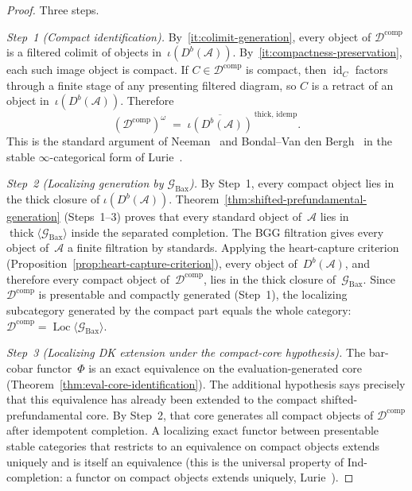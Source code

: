 \begin{proof}
Three steps.

\smallskip\noindent\textit{Step~1 \textup{(}Compact identification\textup{)}.}
By~\ref{it:colimit-generation}, every object of
$\mathcal{D}^{\mathrm{comp}}$ is a filtered colimit of objects
in~$\iota(D^b(\mathcal{A}))$.
By~\ref{it:compactness-preservation}, each such image object is
compact. If $C \in \mathcal{D}^{\mathrm{comp}}$ is compact, then
$\operatorname{id}_C$ factors through a finite stage of any
presenting filtered diagram, so $C$ is a retract of an object
in~$\iota(D^b(\mathcal{A}))$. Therefore
\[
(\mathcal{D}^{\mathrm{comp}})^{\omega}
\;=\;
\overline{\iota(D^b(\mathcal{A}))}^{\,\mathrm{thick,\, idemp}}.
\]
This is the standard argument of
Neeman~\cite[Thm.~2.1]{Neeman92}
and Bondal--Van den Bergh~\cite[Cor.~3.1.2]{BondalVdB03}
in the stable $\infty$-categorical form of
Lurie~\cite[Prop.~5.3.5.10, Prop.~5.5.7.8]{HTT}.

\smallskip\noindent\textit{Step~2 \textup{(}Localizing generation
by $\mathcal{G}_{\mathrm{Bax}}$\textup{)}.}
By Step~1, every compact object lies in the thick closure of
$\iota(D^b(\mathcal{A}))$.
Theorem~\ref{thm:shifted-prefundamental-generation}
\textup{(}Steps~1--3\textup{)} proves that every standard object
of~$\mathcal{A}$ lies in
$\operatorname{thick}\langle \mathcal{G}_{\mathrm{Bax}} \rangle$
inside the separated completion.
The BGG filtration gives every object of~$\mathcal{A}$ a finite
filtration by standards.
Applying the heart-capture criterion
\textup{(}Proposition~\ref{prop:heart-capture-criterion}\textup{)},
every object of~$D^b(\mathcal{A})$, and therefore every compact
object of~$\mathcal{D}^{\mathrm{comp}}$, lies in the thick closure
of~$\mathcal{G}_{\mathrm{Bax}}$.
Since $\mathcal{D}^{\mathrm{comp}}$ is presentable and compactly
generated \textup{(}Step~1\textup{)}, the localizing subcategory
generated by the compact part equals the whole category:
$\mathcal{D}^{\mathrm{comp}} =
\operatorname{Loc}\langle \mathcal{G}_{\mathrm{Bax}} \rangle$.

\smallskip\noindent\textit{Step~3 \textup{(}Localizing DK extension
under the compact-core hypothesis\textup{)}.}
The bar-cobar functor~$\Phi$ is an exact equivalence on the
evaluation-generated core
\textup{(}Theorem~\ref{thm:eval-core-identification}\textup{)}.
The additional hypothesis says precisely that this equivalence has
already been extended to the compact shifted-prefundamental core.
By Step~2, that core generates all compact objects of
$\mathcal{D}^{\mathrm{comp}}$ after idempotent completion.
A localizing exact functor between presentable stable categories
that restricts to an equivalence on compact objects extends uniquely
and is itself an equivalence \textup{(}this is the universal property of
Ind-completion: a functor on compact objects extends uniquely,
Lurie~\cite[Prop.~5.3.5.10]{HTT}\textup{)}.
\end{proof}

